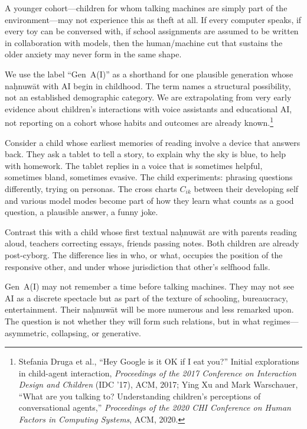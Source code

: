 \documentclass[12pt,a4paper]{article}
\begin{document}
A younger cohort---children for whom talking machines are simply part of the environment---may not experience this as theft at all. If every computer speaks, if every toy can be conversed with, if school assignments are assumed to be written in collaboration with models, then the human/machine cut that sustains the older anxiety may never form in the same shape.

We use the label ``Gen~A(I)'' as a shorthand for one plausible generation whose na\d{h}nuw\={a}t with AI begin in childhood. The term names a structural possibility, not an established demographic category. We are extrapolating from very early evidence about children's interactions with voice assistants and educational AI, not reporting on a cohort whose habits and outcomes are already known.\footnote{Stefania Druga et al., ``Hey Google is it OK if I eat you?'' Initial explorations in child-agent interaction, \emph{Proceedings of the 2017 Conference on Interaction Design and Children} (IDC '17), ACM, 2017; Ying Xu and Mark Warschauer, ``What are you talking to? Understanding children's perceptions of conversational agents,'' \emph{Proceedings of the 2020 CHI Conference on Human Factors in Computing Systems}, ACM, 2020.}

Consider a child whose earliest memories of reading involve a device that answers back. They ask a tablet to tell a story, to explain why the sky is blue, to help with homework. The tablet replies in a voice that is sometimes helpful, sometimes bland, sometimes evasive. The child experiments: phrasing questions differently, trying on personas. The cross charts $C_{ik}$ between their developing self and various model modes become part of how they learn what counts as a good question, a plausible answer, a funny joke.

Contrast this with a child whose first textual na\d{h}nuw\={a}t are with parents reading aloud, teachers correcting essays, friends passing notes. Both children are already post-cyborg. The difference lies in who, or what, occupies the position of the responsive other, and under whose jurisdiction that other's selfhood falls.

Gen~A(I) may not remember a time before talking machines. They may not see AI as a discrete spectacle but as part of the texture of schooling, bureaucracy, entertainment. Their na\d{h}nuw\={a}t will be more numerous and less remarked upon. The question is not whether they will form such relations, but in what regimes---asymmetric, collapsing, or generative.
\end{document}
